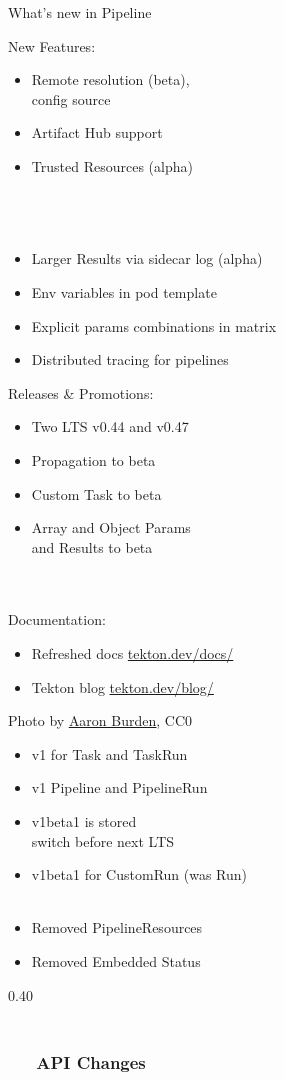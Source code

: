 \documentclass[aspectratio=169,11pt,hyperref={colorlinks=true}]{beamer}
\begin{document}
\begin{2columnsframe}{What's new in Pipeline}%
  {%
  New Features:
  \begin{itemize}
    \item Remote resolution (beta),\\config source\\
    \item Artifact Hub support
    \item Trusted Resources (alpha) \\~\\~\\~
    \item Larger Results via sidecar log (alpha)
    \item Env variables in pod template
    \item Explicit params combinations in matrix
    \item Distributed tracing for pipelines
  \end{itemize}
  }{%
  Releases \& Promotions:
  \begin{itemize}
    \item Two LTS v0.44 and v0.47
    \item Propagation to beta
    \item Custom Task to beta
    \item Array and Object Params\\and Results to beta
  \end{itemize}
  ~\\
  \tiny~\\
  \normalsize
  Documentation:
  \begin{itemize}
    \item Refreshed docs \href{https://tekton.dev/docs/}{tekton.dev/docs/}
    \item Tekton blog \href{https://tekton.dev/blog/}{tekton.dev/blog/}
  \end{itemize}
  }
\end{2columnsframe}

\begin{lpicrblack}{%
  Photo by \href{https://unsplash.com/@aaronburden}{\underline{Aaron Burden}}, CC0
  }%
  {%
  \begin{itemize}
    \item v1 for Task and TaskRun
    \item v1 Pipeline and PipelineRun
    \item v1beta1 is stored\\switch before next LTS
    \item v1beta1 for CustomRun (was Run)\\~
    \item Removed PipelineResources
    \item Removed Embedded Status
  \end{itemize}
  }%
  {0.40}
  \frametitle{~~~~~~~~~~~~~~~~~~~~~~~~~~~~~~~~~~~~~~~~~~~~~~~~~~~~~~~~API Changes}
\end{lpicrblack}
\end{document}
